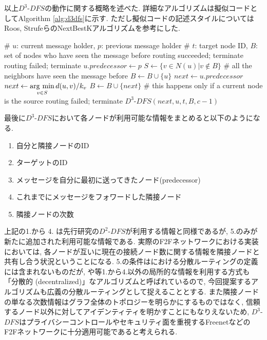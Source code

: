 \documentclass[dvipdfmx]{ampbt}
\newcommand{\argmin}{\mathop{\rm arg~min}\limits}
\begin{document}
以上$D^3$-$DFS$の動作に関する概略を述べた. 詳細なアルゴリズムは擬似コードとしてAlgorithm \ref{alg:d3dfs}に示す. ただし擬似コードの記述スタイルについてはRoos, StrufeらのNextBestKアルゴリズム\cite{roos2012provable}を参考にした.
   \begin{algorithm}[htbp]
    \caption{$D^3$-$DFS(\textrm{Node } u,\textrm{ Node } p, \textrm{ ID } t,\textrm{ Set }B, \textrm{ TTL }c$)}\label{alg:d3dfs}
    \begin{algorithmic}[1]
     \State \# $u$: current message holder, $p$: previous message holder
     \State \# $t$: target node ID, $B$: set of nodes who have seen the message before
     \State \textrm{routing succeeded; terminate}
     \EndIf
     \State \textrm{routing failed; terminate}
     \EndIf
     \State $u.predecessor \gets p$
     \EndIf
     \State $S \gets \{v \in N(u) |  v \notin B \}$
      \# all the neighbors have seen the message before
     \State $B \gets B \cup \{u\}$
     \State $next \gets u.predecessor$
     \Else
     \State $next \gets \argmin_{v \in S} d(u, v)/k_v$
     \State $B \gets B \cup \{ next\}$
     \EndIf
      \# this happens only if a current node is the source
     \State \textrm{routing failed; terminate}
     \Else
     \State $D^3$-$DFS(next, u, t, B, c-1)$
     \EndIf
    \end{algorithmic}
   \end{algorithm}

最後に$D^3$-$DFS$において各ノードが利用可能な情報をまとめると以下のようになる.

\begin{enumerate}
 \item 自分と隣接ノードのID
 \item ターゲットのID
 \item メッセージを自分に最初に送ってきたノード(predecessor)
 \item これまでにメッセージをフォワードした隣接ノード
 \item 隣接ノードの次数
\end{enumerate}

上記の1.から 4. は先行研究の$D^2$-$DFS$が利用する情報と同様であるが, 5.のみが新たに追加された利用可能な情報である. 実際のF2Fネットワークにおける実装においては, 各ノードが互いに現在の接続ノード数に関する情報を隣接ノードと共有し合う状況ということになる. 5.の条件は\cite{kleinberg2000small}における分散ルーティングの定義には含まれないものだが, \cite{manku2004know}や\cite{lebhar2004almost}等1.から4.以外の局所的な情報を利用する方式も「分散的 (decentralized)」なアルゴリズムと呼ばれているので, 今回提案するアルゴリズムも広義の分散ルーティングとして捉えることとする. また隣接ノードの単なる次数情報はグラフ全体のトポロジーを明らかにするものではなく, 信頼するノード以外に対してアイデンティティを明かすことにもなりえないため, $D^3$-$DFS$はプライバシーコントロールやセキュリティ面を重視するFreenetなどのF2Fネットワークに十分適用可能であると考えられる. 
\end{document}
